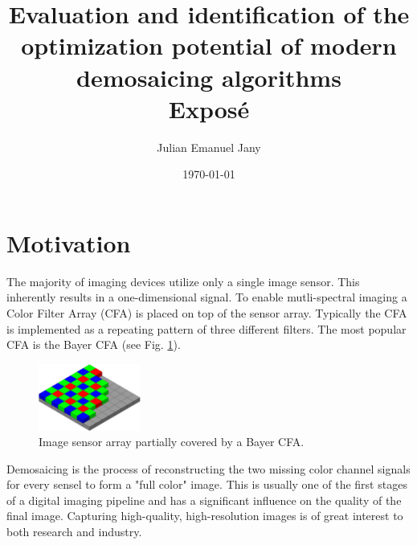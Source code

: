 \documentclass[english,notitlepage,smartquotes]{hgbreport}
\author{Julian Emanuel Jany}                     %
\title{Evaluation and identification of the optimization potential of modern demosaicing algorithms \\ %
			 \textbf{Exposé}}
\date{\today}
\begin{document}
\maketitle



\section{Motivation}

The majority of imaging devices utilize only a single image sensor. This inherently results in a one-dimensional signal. To enable mutli-spectral imaging a Color Filter Array (CFA) is placed on top of the sensor array. Typically the CFA is implemented as a repeating pattern of three different filters. The most popular CFA is the Bayer CFA (see Fig. \ref{fig:bayer_cfa}).

\begin{figure}[]
	\centering
	\includegraphics[width=0.3\textwidth]{bayer_pattern}
\caption{Image sensor array partially covered by a Bayer CFA. \cite{BayerCFA}}
\label{fig:bayer_cfa}
\end{figure}

Demosaicing is the process of reconstructing the two missing color channel signals for every sensel to form a "full color" image. This is usually one of the first stages of a digital imaging pipeline and has a significant influence on the quality of the final image. Capturing high-quality, high-resolution images is of great interest to both research and industry. %
\end{document}
